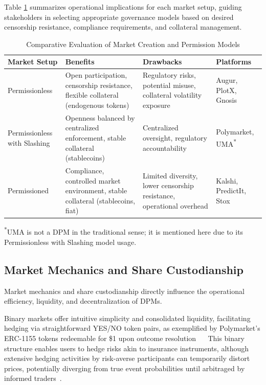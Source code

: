 {Table \ref{tab:market_setup_init} summarizes operational implications for each market setup, guiding stakeholders in selecting appropriate governance models based on desired censorship resistance, compliance requirements, and collateral management.

\begin{table}[htbp]
     \centering
     \caption{Comparative Evaluation of Market Creation and Permission Models}
     \begin{tabular}{
         |p{2.6cm}|
         >{\centering\arraybackslash}p{4.3cm}|
         >{\centering\arraybackslash}p{3.4cm}|
         >{\centering\arraybackslash}p{2.5cm}|
     }
         \hline \textbf{Market Setup} & \textbf{Benefits} & \textbf{Drawbacks} & \textbf{Platforms} \\
         \hline Permissionless & Open participation, censorship resistance, flexible collateral (endogenous tokens) & Regulatory risks, potential misuse, collateral volatility exposure & Augur, PlotX, Gnosis \\
         \hline Permissionless with Slashing & Openness balanced by centralized enforcement, stable collateral (stablecoins) & Centralized oversight, regulatory accountability & Polymarket, UMA\textsuperscript{*} \\
         \hline Permissioned & Compliance, controlled market environment, stable collateral (stablecoins, fiat) & Limited diversity, lower censorship resistance, operational overhead & Kalshi, PredictIt, Stox \\
         \hline
    \end{tabular}
    \label{tab:market_setup_init}
    \vspace{0.5em}
    {\footnotesize\textsuperscript{*}UMA is not a DPM in the traditional sense; it is mentioned here due to its Permissionless with Slashing model usage.}
\end{table}

\subsection{Market Mechanics and Share Custodianship}\label{subsec:market_mechcanics}
Market mechanics and share custodianship directly influence the operational efficiency, liquidity, and decentralization of DPMs.

Binary markets offer intuitive simplicity and consolidated liquidity, facilitating hedging via straightforward YES/NO token pairs, as exemplified by Polymarket’s ERC-1155 tokens redeemable for \$1 upon outcome resolution~\cite{AKPWZ19} ~\cite{IOSG20} This binary structure enables users to hedge risks akin to insurance instruments, although extensive hedging activities by risk-averse participants can temporarily distort prices, potentially diverging from true event probabilities until arbitraged by informed traders~\cite{Ha03}.

}
